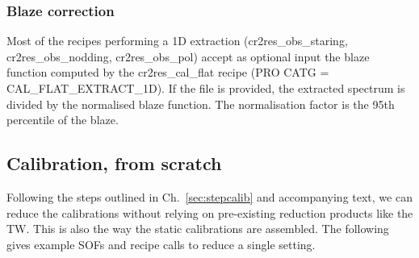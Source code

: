 \subsubsection{Blaze correction}

Most of the recipes performing a 1D extraction (cr2res\_obs\_staring,
cr2res\_obs\_nodding, cr2res\_obs\_pol) accept as optional input the 
blaze function computed by the cr2res\_cal\_flat recipe
(PRO CATG = CAL\_FLAT\_EXTRACT\_1D).
If the file is provided, the extracted spectrum is divided by the
normalised blaze function. The normalisation factor is the 95th
percentile of the blaze.

\subsection{Calibration, from scratch}
\label{sec:calibscratch}
Following the steps outlined in Ch.~\ref{sec:stepcalib} and accompanying text,
we can reduce the calibrations without relying on pre-existing reduction
products like the TW. This is also the way the static calibrations are
assembled. The following gives example SOFs and recipe calls to reduce a single
setting.

